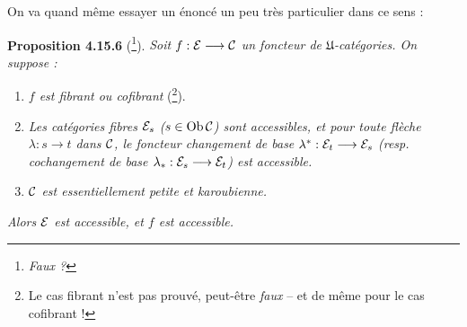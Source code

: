 On va quand même essayer un énoncé un peu très particulier dans ce sens :

\textbf{Proposition 4.15.6} (\footnote[180]{\textit{Faux ?}}). \textit{Soit $f : \mathcal{E} \longrightarrow \mathcal{C}$ un foncteur de $\mathfrak{U}$-catégories. On suppose :}
\begin{enumerate}
\item[\textit{a)}] \textit{$f$ est fibrant ou cofibrant} (\footnote[181]{Le cas fibrant n'est pas prouvé, peut-être \textit{faux} -- et de même pour le cas cofibrant !}).
\item[\textit{b)}] \textit{Les catégories fibres $\mathcal{E}_s$ ($s \in \operatorname{Ob} \mathcal{C}$) sont accessibles, et pour toute flèche $\lambda : s \longrightarrow t$ dans $\mathcal{C}$, le foncteur changement de base $\lambda^* : \mathcal{E}_t \longrightarrow \mathcal{E}_s$ (resp. cochangement de base $\lambda_* : \mathcal{E}_s \longrightarrow \mathcal{E}_t$) est accessible.}
\item[\textit{c)}] \textit{$\mathcal{C}$ est essentiellement petite et karoubienne.}
\end{enumerate}
\textit{Alors $\mathcal{E}$ est accessible, et $f$ est accessible.}

